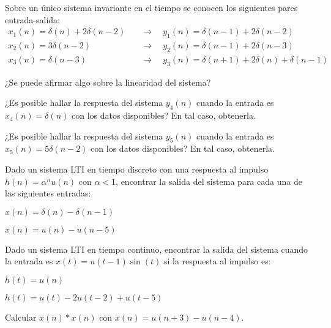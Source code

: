     \begin{ejercicio}
    Sobre un único sistema invariante en el tiempo se conocen los siguientes pares entrada-salida:
    \begin{align*}
        x_1(n) = \delta(n) + 2\delta(n-2) & \hspace{1em}\longrightarrow\hspace{1em} y_1(n) = \delta(n-1) + 2\delta(n-2) \\[.5em]
        x_2(n) = 3 \delta(n-2) & \hspace{1em}\longrightarrow\hspace{1em} y_2(n) = \delta(n-1) + 2 \delta(n-3) \\[.5em]
        x_3(n) = \delta(n-3) & \hspace{1em}\longrightarrow\hspace{1em} y_3(n) = \delta(n+1) + 2 \delta(n) + \delta(n-1)
    \end{align*}
    
    \inciso ¿Se puede afirmar algo sobre la linearidad del sistema?
    
    \inciso ¿Es posible hallar la respuesta del sistema $y_4(n)$ cuando la entrada es $x_4(n)=\delta(n)$ con los datos disponibles? En tal caso, obtenerla.
    
    \inciso ¿Es posible hallar la respuesta del sistema $y_5(n)$ cuando la entrada es $x_5(n)=5\delta(n-2)$ con los datos disponibles? En tal caso, obtenerla.
    \end{ejercicio}
    
    \begin{ejercicio}
    Dado un sistema LTI en tiempo discreto con una respuesta al impulso $h(n) = \alpha^n u(n)$ con $\alpha<1$, encontrar la salida del sistema para cada una de las siguientes entradas:
    
    \inciso $x(n) = \delta(n) - \delta(n-1)$
    
    \inciso $x(n) = u(n) - u(n-5)$
    \end{ejercicio}
    
    \begin{ejercicio}
    Dado un sistema LTI en tiempo continuo, encontrar la salida del sistema cuando la entrada es $x(t) = u(t-1)\sin(t)$ si la respuesta al impulso es:
    
    \inciso $h(t) = u(n)$ 
    
    \inciso $h(t) = u(t) - 2u(t-2) + u(t-5)$
    \end{ejercicio}
    
    \begin{ejercicio}
    Calcular $x(n) * x(n)$ con $x(n)=u(n+3) - u(n-4)$.
    \end{ejercicio}
    
